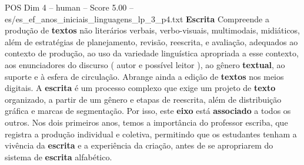 \begin{textsample}{POS Dim 4 – human – Score 5.00 – es/es\_ef\_anos\_iniciais\_linguagens\_lp\_3\_p4.txt}  \label{ex:f4_pos_013}
\textbf{Escrita} Compreende a produção de \textbf{textos} não literários verbais, verbo-visuais, multimodais, midiáticos, além de estratégias de planejamento, revisão, reescrita, e avaliação, adequados ao contexto de produção, ao uso da variedade linguística apropriada a esse contexto, aos enunciadores do discurso ( autor e possível leitor ), ao gênero \textbf{textual}, ao suporte e à esfera de circulação.
Abrange ainda a edição de \textbf{textos} nos meios digitais.
A \textbf{escrita} é um processo complexo que exige um projeto de \textbf{texto} organizado, a partir de um gênero e etapas de reescrita, além de distribuição gráfica e marcas de segmentação.
Por isso, este \textbf{eixo} está \textbf{associado} a todos os outros.
Nos dois primeiros anos, temos a importância do professor escriba, que registra a produção individual e coletiva, permitindo que os estudantes tenham a vivência da \textbf{escrita} e a experiência da criação, antes de se apropriarem do sistema de \textbf{escrita} alfabético.

\end{textsample}
